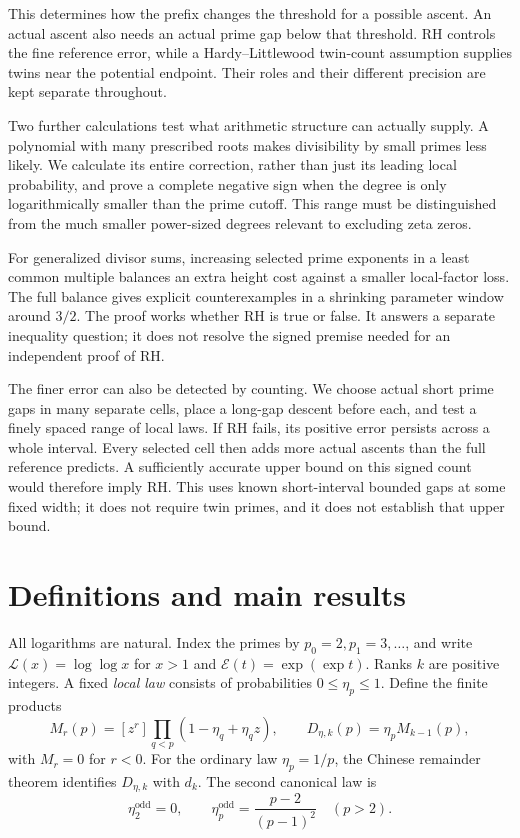 \documentclass[11pt]{article}
\theoremstyle{definition}
\newcommand{\LL}{\mathcal L}
\newcommand{\EE}{\mathcal E}
\begin{document}
This determines how the prefix changes the threshold for a possible
ascent. An actual ascent also needs an actual prime gap below that
threshold. RH controls the fine reference error, while a
Hardy--Littlewood twin-count assumption supplies twins near the
potential endpoint. Their roles and their different precision are
kept separate throughout.

Two further calculations test what arithmetic structure can actually
supply. A polynomial with many prescribed roots makes divisibility
by small primes less likely. We calculate its entire correction,
rather than just its leading local probability, and prove a complete
negative sign when the degree is only logarithmically smaller than
the prime cutoff. This range must be distinguished from the much
smaller power-sized degrees relevant to excluding zeta zeros.

For generalized divisor sums, increasing selected prime exponents
in a least common multiple balances an extra height cost against
a smaller local-factor loss. The full balance gives explicit
counterexamples in a shrinking parameter window around $3/2$.
The proof works whether RH is true or false. It answers a separate
inequality question; it does not resolve the signed premise needed
for an independent proof of RH.

The finer error can also be detected by counting. We choose actual short
prime gaps in many separate cells, place a long-gap descent before each,
and test a finely spaced range of local laws. If RH fails, its positive
error persists across a whole interval. Every selected cell then adds
more actual ascents than the full reference predicts. A sufficiently
accurate upper bound on this signed count would therefore imply RH.
This uses known short-interval bounded gaps at some fixed width; it
does not require twin primes, and it does not establish that upper bound.

\section{Definitions and main results}\label{sec:statements}
All logarithms are natural. Index the primes by $p_0=2,p_1=3,\ldots$,
and write $\LL(x)=\log\log x$ for $x>1$ and
$\EE(t)=\exp(\exp t)$. Ranks $k$ are positive integers.
A fixed \emph{local law} consists of probabilities $0\le\eta_p\le1$.
Define the finite products
\begin{equation}\label{eq:density}
 M_r(p)=[z^r]\prod_{q<p}(1-\eta_q+\eta_qz),\qquad
 D_{\eta,k}(p)=\eta_pM_{k-1}(p),
\end{equation}
with $M_r=0$ for $r<0$. For the ordinary law $\eta_p=1/p$,
the Chinese remainder theorem identifies $D_{\eta,k}$ with $d_k$.
The second canonical law is
\begin{equation}\label{eq:odd}
 \eta_2^{\mathrm{odd}}=0,\qquad
 \eta_p^{\mathrm{odd}}=\frac{p-2}{(p-1)^2}\quad(p>2).
\end{equation}
\end{document}
